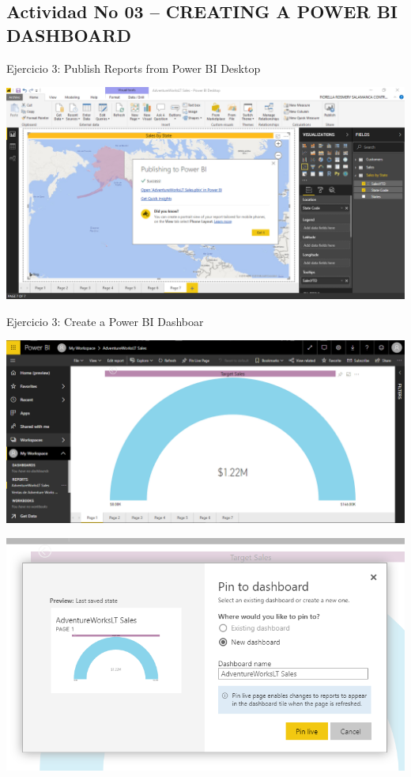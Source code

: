 \subsection{Actividad No 03 –  CREATING A POWER BI DASHBOARD}

Ejercicio 3: Publish Reports from Power BI Desktop \\


	

	\begin{center}
	\includegraphics[width=18cm]{./Imagenes/EJER3T1(2)}
	\end{center}
\newpage	
Ejercicio 3: Create a Power BI Dashboar \\
	\begin{center}
	\includegraphics[width=18cm]{./Imagenes/EJER3T2(1)}
	\end{center}	

	\begin{center}
	\includegraphics[width=18cm]{./Imagenes/EJER3T2(2)}
	\end{center}	

